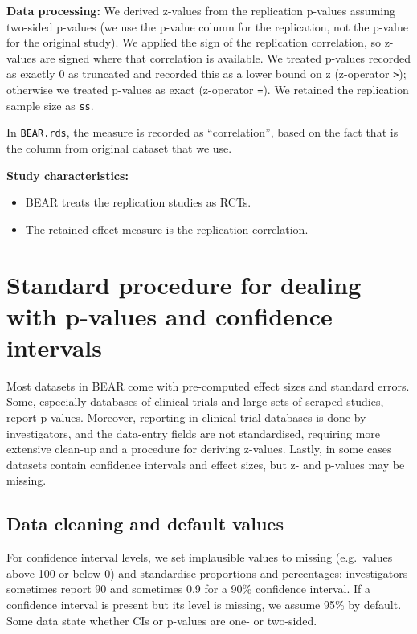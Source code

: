\documentclass[
  11pt,
]{article}
\providecommand{\tightlist}{%
  \setlength{\itemsep}{0pt}\setlength{\parskip}{0pt}}
\begin{document}
\textbf{Data processing:} We derived z-values from the replication
p-values assuming two-sided p-values (we use the p-value column for the
replication, not the p-value for the original study). We applied the
sign of the replication correlation, so z-values are signed where that
correlation is available. We treated p-values recorded as exactly 0 as
truncated and recorded this as a lower bound on z (z-operator
\texttt{\textgreater{}}); otherwise we treated p-values as exact
(z-operator \texttt{=}). We retained the replication sample size as
\texttt{ss}.

In \texttt{BEAR.rds}, the measure is recorded as ``correlation'', based
on the fact that is the column from original dataset that we use.

\textbf{Study characteristics:}

\begin{itemize}
\tightlist
\item
  BEAR treats the replication studies as RCTs.
\item
  The retained effect measure is the replication correlation.
\end{itemize}

\newpage

\section{Standard procedure for dealing with p-values and confidence
intervals}\label{standard-procedure-for-dealing-with-p-values-and-confidence-intervals}

Most datasets in BEAR come with pre-computed effect sizes and standard
errors. Some, especially databases of clinical trials and large sets of
scraped studies, report p-values. Moreover, reporting in clinical trial
databases is done by investigators, and the data-entry fields are not
standardised, requiring more extensive clean-up and a procedure for
deriving z-values. Lastly, in some cases datasets contain confidence
intervals and effect sizes, but z- and p-values may be missing.

\subsection{Data cleaning and default
values}\label{data-cleaning-and-default-values}

For confidence interval levels, we set implausible values to missing
(e.g.~values above 100 or below 0) and standardise proportions and
percentages: investigators sometimes report 90 and sometimes 0.9 for a
90\% confidence interval. If a confidence interval is present but its
level is missing, we assume 95\% by default. Some data state whether CIs
or p-values are one- or two-sided.
\end{document}
